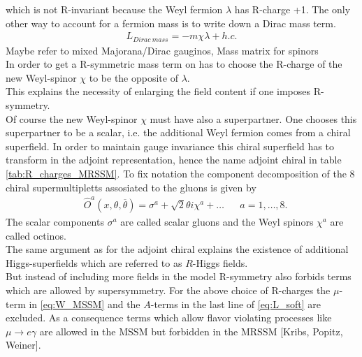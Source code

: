 which is not R-invariant because the Weyl fermion $\lambda$ has R-charge +1. The only other way to account for a fermion mass is to write down a Dirac mass term.
\begin{align}
L_{Dirac\ mass} = -m \chi\lambda + h.c.
\end{align}
Maybe refer to mixed Majorana/Dirac gauginos, Mass matrix for spinors\\
In order to get a R-symmetric mass term on has to choose the R-charge of the new Weyl-spinor $\chi$ to be the opposite of $\lambda$.\\
This explains the necessity of enlarging the field content if one imposes R-symmetry.\\
Of course the new Weyl-spinor $\chi$ must have also a superpartner. One chooses this superpartner to be a scalar, i.e. the additional Weyl fermion comes from a chiral superfield. In order to maintain gauge invariance this chiral superfield has to transform in the adjoint representation, hence the name adjoint chiral in table \ref{tab:R_charges_MRSSM}. To fix notation the component decomposition of the 8 chiral supermultipletts assosiated to the gluons is given by
\begin{align}
&\hat{O}^a(x, \theta, \overline{\theta}) = \sigma^a + \sqrt{2}\theta i\chi^a + \hdots && a = 1,\hdots,8.
\end{align}
The scalar components $\sigma^a$ are called scalar gluons and the Weyl spinors $\chi^a$ are called octinos.\\
The same argument as for the adjoint chiral explains the existence of additional Higgs-superfields which are referred to as $R$-Higgs fields.\\
But instead of including more fields in the model R-symmetry also forbids terms which are allowed by supersymmetry. For the above choice of R-charges the $\mu$-term in \ref{eq:W_MSSM} and the $A$-terms in the last line of \ref{eq:L_soft} are excluded. As a consequence terms which allow flavor violating processes like $\mu \to e \gamma$ are allowed in the MSSM but forbidden in the MRSSM [Kribs, Popitz, Weiner].



